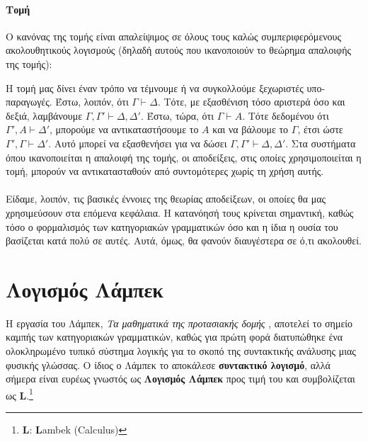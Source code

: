 \documentclass [a4paper,11pt] {book}
\theoremstyle{definition}
\theoremstyle{definition}
\begin{document}
\paragraph{Τομή}
\label{Cut}
Ο κανόνας της τομής είναι απαλείψιμος σε όλους τους καλώς συμπεριφερόμενους ακολουθητικούς λογισμούς (δηλαδή αυτούς που ικανοποιούν το θεώρημα απαλοιφής της τομής):
\begin{prooftree}
\end{prooftree}
Η τομή μας δίνει έναν τρόπο να τέμνουμε ή να συγκολλούμε ξεχωριστές υπο-παραγωγές. Έστω, λοιπόν, ότι $\Gamma\vdash\Delta$. Τότε, με εξασθένιση τόσο αριστερά όσο και δεξιά, λαμβάνουμε $\Gamma,\Gamma'\vdash\Delta,\Delta'$. Έστω, τώρα, ότι $\Gamma\vdash A$. Τότε δεδομένου ότι $\Gamma',A\vdash\Delta'$, μπορούμε να αντικαταστήσουμε το $A$ και να βάλουμε το $\Gamma$, έτσι ώστε $\Gamma',\Gamma\vdash\Delta'$. Αυτό μπορεί να εξασθενήσει για να δώσει $\Gamma,\Gamma'\vdash\Delta,\Delta'$. Στα συστήματα όπου ικανοποιείται η απαλοιφή της τομής, οι αποδείξεις, στις οποίες χρησιμοποιείται η τομή, μπορούν να αντικατασταθούν από συντομότερες χωρίς τη χρήση αυτής.
\paragraph{}
Είδαμε, λοιπόν, τις βασικές έννοιες της θεωρίας αποδείξεων, οι οποίες θα μας χρησιμεύσουν στα επόμενα κεφάλαια. Η κατανόησή τους κρίνεται σημαντική, καθώς τόσο ο φορμαλισμός των κατηγοριακών γραμματικών όσο και η ίδια η ουσία του βασίζεται κατά πολύ σε αυτές. Αυτά, όμως, θα φανούν διαυγέστερα σε ό,τι ακολουθεί.



\section{Λογισμός Λάμπεκ}
\label{sec:LabmekCalculus}
Η εργασία του Λάμπεκ, \textit{Τα μαθηματικά της προτασιακής δομής} \citep{lamb:math58}, αποτελεί το σημείο καμπής των κατηγοριακών γραμματικών, καθώς για πρώτη φορά διατυπώθηκε ένα ολοκληρωμένο τυπικό σύστημα λογικής για το σκοπό της συντακτικής ανάλυσης μιας φυσικής γλώσσας. Ο ίδιος ο Λάμπεκ το αποκάλεσε \textbf{συντακτικό λογισμό}, αλλά σήμερα είναι ευρέως γνωστός ως \textbf{Λογισμός Λάμπεκ} προς τιμή του και συμβολίζεται ως \textbf{L}.\footnote{\textbf{L}: \textbf{L}ambek (Calculus)}
\end{document}
